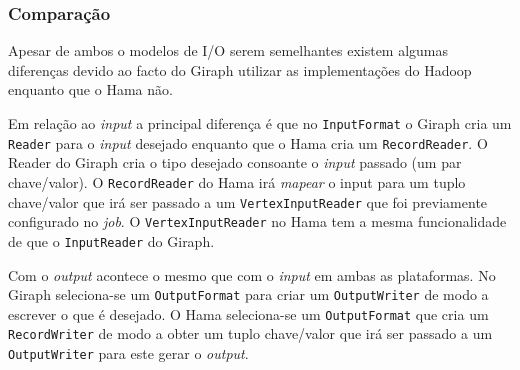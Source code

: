 
\subsubsection*{Comparação}

Apesar de ambos o modelos de I/O serem semelhantes existem algumas diferenças devido ao facto do Giraph utilizar as implementações 
do Hadoop enquanto que o Hama não. 

Em relação ao \textit{input} a principal diferença é que no \texttt{InputFormat} o Giraph cria um \texttt{Reader} para o \textit{input} desejado enquanto que 
o Hama cria um \texttt{RecordReader}. O Reader do Giraph cria o tipo desejado consoante o \textit{input} passado (um par chave/valor). O \texttt{RecordReader}
do Hama irá \textit{mapear} o input para um tuplo chave/valor que irá ser passado a um \texttt{VertexInputReader} que foi previamente configurado no \textit{job}. O \texttt{VertexInputReader}
no Hama tem a mesma funcionalidade de que o \texttt{InputReader} do Giraph.

Com o \textit{output} acontece o mesmo que com o \textit{input} em ambas as plataformas. No Giraph seleciona-se um \texttt{OutputFormat} para criar um \texttt{OutputWriter} de modo
a escrever o que é desejado. O Hama seleciona-se um \texttt{OutputFormat} que cria um \texttt{RecordWriter} de modo a obter um tuplo chave/valor que irá ser
passado a um \texttt{OutputWriter} para este gerar o \textit{output}.